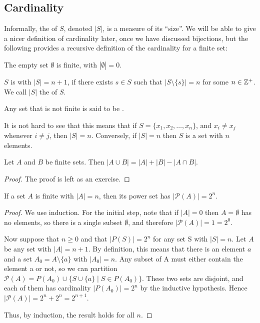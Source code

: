 \subsection{Cardinality}
Informally, the  of $S$, denoted $|S|$, is a measure of its ``size''. We will be able to give a nicer definition of cardinality later, once we have discussed bijections, but the following provides a recursive definition of the cardinality for a finite set:

\begin{definition}
The empty set $\emptyset$ is finite, with $|\emptyset|=0$.

$S$ is  with $|S|=n+1$, if there exists $s \in S$ such that $|S\setminus \{s\}| = n$ for some $n \in \mathbb Z^+$. We call $|S|$ the  of $S$. 

Any set that is not finite is said to be .
\end{definition}

It is not hard to see that this means that if $S = \{x_1,x_2,\dots,x_n\}$, and $x_i \neq x_j$ whenever $i \neq j$, then $|S| = n$. Conversely, if $|S| = n$ then $S$ is a set with $n$ elements.

\begin{proposition}
Let $A$ and $B$ be finite sets. Then $|A \cup B| = |A| + |B| - |A \cap B|$.
\end{proposition}

\begin{proof}
The proof is left as an exercise.
\end{proof}

\begin{proposition}
If a set $A$ is finite with $|A| = n$, then its power set has $|\mathcal{P}(A)| = 2^n$.
\end{proposition}

\begin{proof}
We use induction. For the initial step, note that if $|A| = 0$ then $A = \emptyset$ has no elements, so there is a single subset $\emptyset$, and therefore $|\mathcal{P}(A)| = 1 = 2^0$.

Now suppose that $n \ge 0$ and that $|P(S)| = 2^n$ for any set S with $|S| = n$. Let $A$ be any set with $|A| = n+1$. By definition, this means that there is an element $a$ and a set $A_0 = A\setminus\{a\}$ with $|A_0| = n$. Any subset of A must either contain the element a or not, so we can partition $\mathcal{P}(A) = P(A_0) \cup \{S \cup \{a\} \mid S \in P(A_0)\}$. These two sets are disjoint, and each of them has cardinality $|P(A_0)| = 2^n$ by the inductive hypothesis. Hence $|\mathcal{P}(A)| = 2^n + 2^n = 2^{n+1}$.

Thus, by induction, the result holds for all $n$.
\end{proof}

